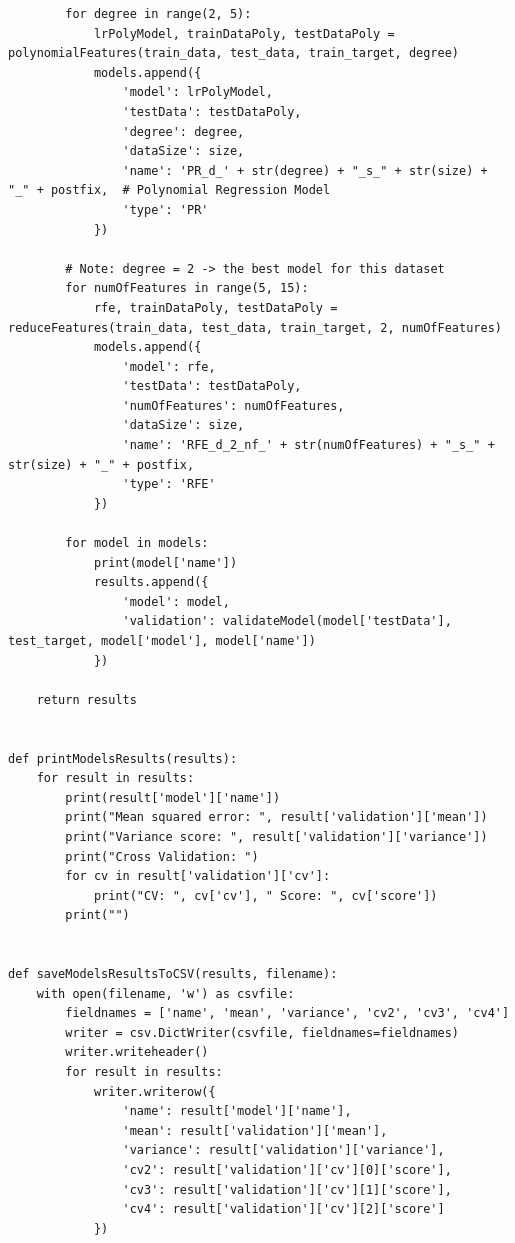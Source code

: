 \documentclass[11pt, a4paper, notitlepage]{report}
\begin{document}
\begin{appendices}
\begin{verbatim}
        for degree in range(2, 5):
            lrPolyModel, trainDataPoly, testDataPoly = polynomialFeatures(train_data, test_data, train_target, degree)
            models.append({
                'model': lrPolyModel,
                'testData': testDataPoly,
                'degree': degree,
                'dataSize': size,
                'name': 'PR_d_' + str(degree) + "_s_" + str(size) + "_" + postfix,  # Polynomial Regression Model
                'type': 'PR'
            })

        # Note: degree = 2 -> the best model for this dataset
        for numOfFeatures in range(5, 15):
            rfe, trainDataPoly, testDataPoly = reduceFeatures(train_data, test_data, train_target, 2, numOfFeatures)
            models.append({
                'model': rfe,
                'testData': testDataPoly,
                'numOfFeatures': numOfFeatures,
                'dataSize': size,
                'name': 'RFE_d_2_nf_' + str(numOfFeatures) + "_s_" + str(size) + "_" + postfix,
                'type': 'RFE'
            })

        for model in models:
            print(model['name'])
            results.append({
                'model': model,
                'validation': validateModel(model['testData'], test_target, model['model'], model['name'])
            })

    return results


def printModelsResults(results):
    for result in results:
        print(result['model']['name'])
        print("Mean squared error: ", result['validation']['mean'])
        print("Variance score: ", result['validation']['variance'])
        print("Cross Validation: ")
        for cv in result['validation']['cv']:
            print("CV: ", cv['cv'], " Score: ", cv['score'])
        print("")


def saveModelsResultsToCSV(results, filename):
    with open(filename, 'w') as csvfile:
        fieldnames = ['name', 'mean', 'variance', 'cv2', 'cv3', 'cv4']
        writer = csv.DictWriter(csvfile, fieldnames=fieldnames)
        writer.writeheader()
        for result in results:
            writer.writerow({
                'name': result['model']['name'],
                'mean': result['validation']['mean'],
                'variance': result['validation']['variance'],
                'cv2': result['validation']['cv'][0]['score'],
                'cv3': result['validation']['cv'][1]['score'],
                'cv4': result['validation']['cv'][2]['score']
            })



\end{verbatim}
\end{appendices}
\end{document}
